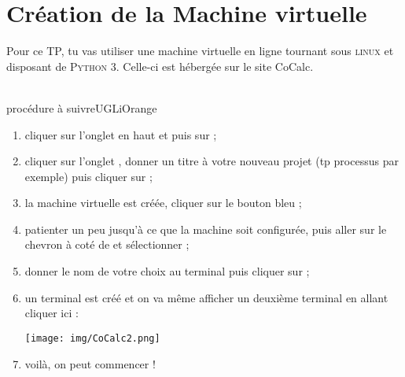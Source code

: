 \documentclass[a4paper,12pt,french]{book}
\begin{document}
\section*{Création de la Machine virtuelle}

Pour ce TP, tu vas utiliser une machine virtuelle en ligne tournant sous \textsc{linux} et disposant de \textsc{Python 3}. Celle-ci est hébergée sur le site CoCalc.\\

\\


\begin{encadrecolore}{procédure à suivre}{UGLiOrange}
\begin{enumerate}[\bfseries 1.]
    \item cliquer sur l'onglet  en haut et puis sur  ;
    \item cliquer sur l'onglet , donner un titre à votre nouveau projet (tp processus par exemple) puis cliquer sur  ;
    \item la machine virtuelle est créée, cliquer sur le bouton bleu  ;
    \item patienter un peu jusqu'à ce que la machine soit configurée, puis aller sur le chevron à coté de  et sélectionner  ;
    \item donner le nom de votre choix au terminal puis cliquer sur  ;
    \item un terminal est créé et on va même afficher un deuxième terminal en allant cliquer ici :
    \begin{center}
    \texttt{[image: img/CoCalc2.png]}
    \end{center}
    \item voilà, on peut commencer !
\end{enumerate}

\end{encadrecolore}
\newpage
\end{document}
